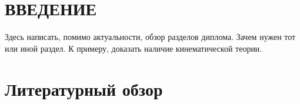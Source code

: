 \section*{ \centering ВВЕДЕНИЕ }
Здесь написать, помимо актуальности, обзор разделов диплома. Зачем нужен тот или иной раздел.
К примеру, доказать наличие кинематической теории.
\newpage
\section{Литературный обзор}



% 


